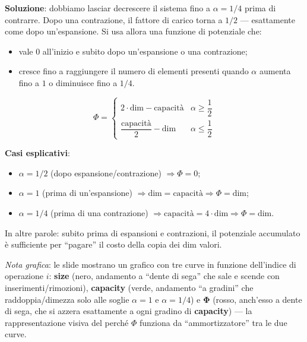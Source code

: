 \documentclass[12pt, a4paper]{article}
\begin{document}
\textbf{Soluzione}: dobbiamo lasciar decrescere il sistema fino a $\alpha = 1/4$ prima di contrarre. Dopo una contrazione, il fattore di carico torna a $1/2$ — esattamente come dopo un'espansione. Si usa allora una funzione di potenziale che:
\begin{itemize}
    \item vale $0$ all'inizio e subito dopo un'espansione o una contrazione;
    \item cresce fino a raggiungere il numero di elementi presenti quando $\alpha$ aumenta fino a $1$ o diminuisce fino a $1/4$.
\end{itemize}

\begin{tcolorbox}[colback=lightergray!10, colframe=tocsec, title=\textbf{Funzione di Potenziale per la Contrazione}]
\label{def:potenziale-contrazione}
$$\Phi = \begin{cases} 2\cdot\text{dim} - \text{capacità} & \alpha \ge \dfrac{1}{2} \\[4pt] \dfrac{\text{capacità}}{2} - \text{dim} & \alpha \le \dfrac{1}{2} \end{cases}$$
\end{tcolorbox}

\textbf{Casi esplicativi}:
\begin{itemize}
    \item $\alpha = 1/2$ (dopo espansione/contrazione) $\Rightarrow \Phi = 0$;
    \item $\alpha = 1$ (prima di un'espansione) $\Rightarrow \text{dim} = \text{capacità} \Rightarrow \Phi = \text{dim}$;
    \item $\alpha = 1/4$ (prima di una contrazione) $\Rightarrow \text{capacità} = 4\cdot\text{dim} \Rightarrow \Phi = \text{dim}$.
\end{itemize}
In altre parole: subito prima di espansioni e contrazioni, il potenziale accumulato è sufficiente per ``pagare'' il costo della copia dei $\text{dim}$ valori.

\textit{Nota grafica}: le slide mostrano un grafico con tre curve in funzione dell'indice di operazione $i$: \textbf{size} (nero, andamento a ``dente di sega'' che sale e scende con inserimenti/rimozioni), \textbf{capacity} (verde, andamento ``a gradini'' che raddoppia/dimezza solo alle soglie $\alpha=1$ e $\alpha=1/4$) e $\mathbf{\Phi}$ (rosso, anch'esso a dente di sega, che si azzera esattamente a ogni gradino di \textbf{capacity}) — la rappresentazione visiva del perché $\Phi$ funziona da ``ammortizzatore'' tra le due curve.
\end{document}
